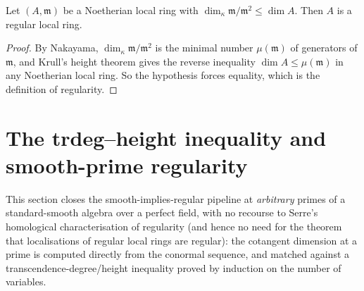 \begin{lemma}
  \label{lem:regular_of_cotangent_le_dim}
  \leanok
  Let \((A, \mathfrak m)\) be a Noetherian local ring with
  \(\dim_\kappa \mathfrak m/\mathfrak m^2 \leq \dim A\). Then \(A\) is a regular local
  ring.
\end{lemma}
\begin{proof}
  \leanok
  By Nakayama, \(\dim_\kappa \mathfrak m/\mathfrak m^2\) is the minimal number
  \(\mu(\mathfrak m)\) of generators of \(\mathfrak m\), and Krull's height theorem
  gives the reverse inequality \(\dim A \leq \mu(\mathfrak m)\) in any Noetherian local
  ring. So the hypothesis forces equality, which is the definition of regularity.
\end{proof}

\section{The trdeg--height inequality and smooth-prime regularity}
\label{sec:smooth_prime_regularity}

This section closes the smooth-implies-regular pipeline at \emph{arbitrary} primes of a
standard-smooth algebra over a perfect field, with no recourse to Serre's homological
characterisation of regularity (and hence no need for the theorem that localisations of
regular local rings are regular): the cotangent dimension at a prime is computed
directly from the conormal sequence, and matched against a transcendence-degree/height
inequality proved by induction on the number of variables.

